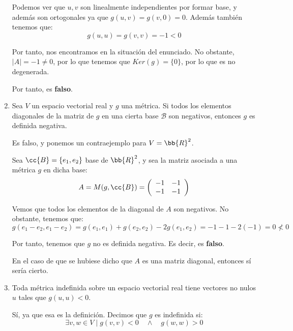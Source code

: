 \begin{ejercicio}
\begin{enumerate}
        Podemos ver que $u,v$ son linealmente independientes por formar base, y además son ortogonales ya que $g(u,v)=g(v,0)=0$. Además también tenemos que:
        \begin{equation*}
            g(u,u)= g(v,v) = -1 < 0
        \end{equation*}

        Por tanto, nos encontramos en la situación del enunciado. No obstante, $|A|=-1 \neq 0$, por lo que tenemos que $Ker(g)= \{0\}$, por lo que es no degenerada.

        Por tanto, es \textbf{falso}.

        \item Sea $V$ un espacio vectorial real y $g$ una métrica. Si todos los elementos diagonales de la matriz de $g$ en una cierta base $\mathcal{B}$ son negativos, entonces $g$ es definida negativa.

        Es falso, y ponemos un contraejemplo para $V=\bb{R}^2$.

        Sea $\cc{B}=\{e_1, e_2\}$ base de $\bb{R}^2$, y sea la matriz asociada a una métrica $g$ en dicha base:
        \begin{equation*}
            A = M(g, \cc{B}) = \left( \begin{array}{cc}
                -1 & -1\\
                -1 & -1\\
            \end{array} \right)
        \end{equation*}
        
        Vemos que todos los elementos de la diagonal de $A$ son negativos. No obstante, tenemos que:
        \begin{equation*}
            g(e_1-e_2, e_1-e_2) = g(e_1, e_1) + g(e_2, e_2) -2g(e_1, e_2) = -1 -1 -2(-1) = 0 \nless 0
        \end{equation*}

        Por tanto, tenemos que $g$ no es definida negativa. Es decir, es \textbf{falso}.

        En el caso de que se hubiese dicho que $A$ es una matriz diagonal, entonces sí sería cierto.

        \item Toda métrica indefinida sobre un espacio vectorial real tiene vectores no nulos $u$ tales que $g(u,u) < 0$.

        Sí, ya que esa es la definición. Decimos que $g$ es indefinida si:
        \begin{equation*}
            \exists v,w \in V \mid g(v,v)<0 \quad \land \quad g(w,w)>0
        \end{equation*}


\end{enumerate}
\end{ejercicio}
